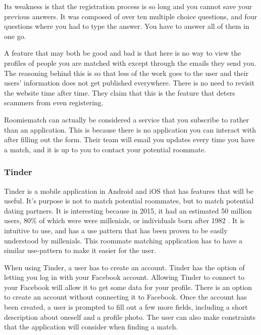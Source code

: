 \documentclass[journal]{IEEEtran}
\begin{document}
        Its weakness is that the registration process is so long and you cannot save your previous answers. It was composed of
        over ten multiple choice questions, and four questions where you had to type the answer. You have to answer all of them
        in one go.

        A feature that may both be good and bad is that here is no way to view the profiles of people you are matched with
        except through the emails they send you. The reasoning behind this is so that less of the work goes to the user and
        their users' information does not get published everywhere. There is no need to revisit the website time after time.
        They claim that this is the feature that deters scammers from even registering.

        Roomiematch can actually be considered a service that you subscribe to rather than an application. This is because there
        is no application you can interact with after filling out the form. Their team will email you updates every time you
        have a match, and it is up to you to contact your potential roommate. 

        \subsubsection{Tinder}
        Tinder is a mobile application in Android and iOS that has features that will be useful. It's purpose is not to match
        potential roommates, but to match potential dating partners. It is interesting because in 2015, it had an estimated 50
        million users\cite{tinderstat2}, 80\% of which were were millenials, or individuals born after 1982
        \cite{tinderstat}\cite{millenial}. It is intuitive to use, and has a use pattern that has been proven to be easily
        understood by millenials. This roommate matching application has to have a similar use-pattern to make it easier for the
        user. 

        When using Tinder, a user has to create an account. Tinder has the option of letting you log in with your Facebook
        account. Allowing Tinder to connect to your Facebook will allow it to get some data for your profile. There is an option
        to create an account without connecting it to Facebook. Once the account has been created, a user is prompted to fill
        out a few more fields, including a short description about oneself and a profile photo. The user can also make
        constraints that the application will consider when finding a match.
\end{document}

